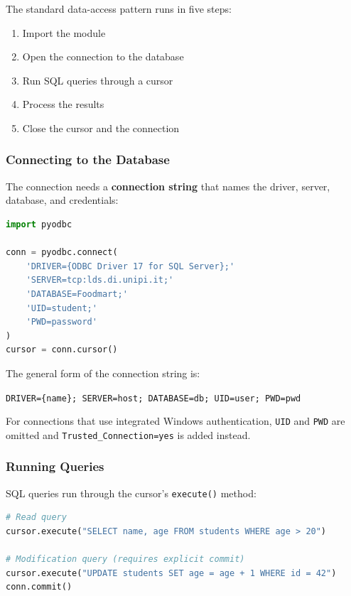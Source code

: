 The standard data-access pattern runs in five steps:

\begin{enumerate}
    \item Import the module
    \item Open the connection to the database
    \item Run SQL queries through a cursor
    \item Process the results
    \item Close the cursor and the connection
\end{enumerate}

\subsubsection{Connecting to the Database}
\label{subsec:pyodbc-connection}

The connection needs a \textbf{connection string} that names the driver, server, database, and credentials:

\begin{lstlisting}[language=Python, basicstyle=\ttfamily\scriptsize]
import pyodbc

conn = pyodbc.connect(
    'DRIVER={ODBC Driver 17 for SQL Server};'
    'SERVER=tcp:lds.di.unipi.it;'
    'DATABASE=Foodmart;'
    'UID=student;'
    'PWD=password'
)
cursor = conn.cursor()
\end{lstlisting}

The general form of the connection string is:

\begin{center}
\texttt{DRIVER=\{name\}; SERVER=host; DATABASE=db; UID=user; PWD=pwd}
\end{center}

For connections that use integrated Windows authentication, \texttt{UID} and \texttt{PWD} are omitted and \texttt{Trusted\_Connection=yes} is added instead.

\subsubsection{Running Queries}
\label{subsec:pyodbc-queries}

SQL queries run through the cursor's \texttt{execute()} method:

\begin{lstlisting}[language=Python, basicstyle=\ttfamily\scriptsize]
# Read query
cursor.execute("SELECT name, age FROM students WHERE age > 20")

# Modification query (requires explicit commit)
cursor.execute("UPDATE students SET age = age + 1 WHERE id = 42")
conn.commit()
\end{lstlisting}

